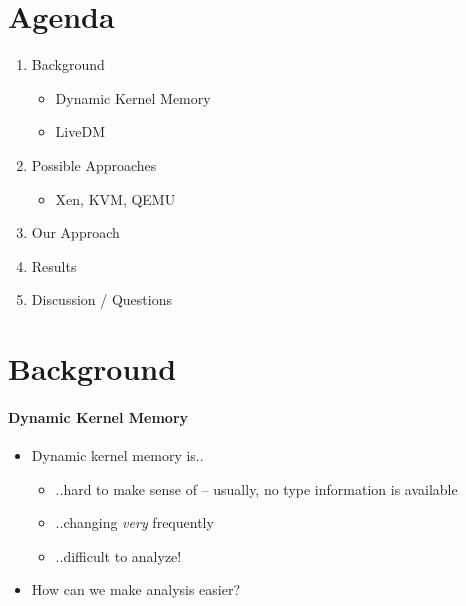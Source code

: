 \documentclass{i20lecture}
\subtitle{LiveDM - Proof of Concept}
\begin{document}
\frame{\titlepage}

\section{Agenda}
\begin{frame}{\insertsection}
  \begin{enumerate}
   \item Background
   \begin{itemize}
    \item Dynamic Kernel Memory
    \item LiveDM
   \end{itemize}
   \item Possible Approaches
   \begin{itemize}
    \item Xen, KVM, QEMU
   \end{itemize}
   \item Our Approach
   \item Results
   \item Discussion / Questions
  \end{enumerate}
\end{frame}

\section{Background}
\begin{frame}{\insertsection}
  \framesubtitle{Dynamic Kernel Memory}
  
  \begin{itemize}
    \item Dynamic kernel memory is..
    \begin{itemize}
\pause
    \item ..hard to make sense of -- usually, no type information is available
\pause
    \item ..changing \textit{very} frequently
\pause
    \item ..difficult to analyze!
    \end{itemize}
\pause
    \item How can we make analysis easier?
  \end{itemize}
\end{frame}
\end{document}

